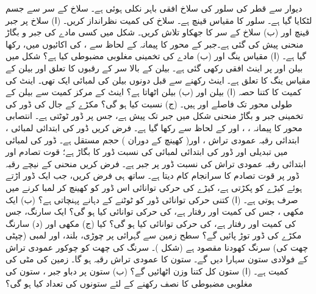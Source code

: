دیوار سے  قطر کی  سلور  کی سلاخ افقی  باہر نکلی ہوئی ہے۔ سلاخ کے سر
 سے  جسم لٹکایا گیا ہے۔ سلور  کا مقیاس قینچ   ہے۔ سلاخ کی کمیت نظرانداز کریں۔ (ا) سلاخ پر جبر  قینچ اور (ب)  سلاخ کے سر کا جھکاو تلاش کریں۔
شکل  میں کسی مادے کی  جبر و بگاڑ منحنی پیش  کی گئی ہے۔جبر کے محور کا پیمانہ  کے لحاظ سے ،  کی اکائیوں میں، رکھا گیا ہے۔ (ا) مقیاس ینگ اور (ب)  مادے کی تخمینی مغلوبی مضبوطی کیا ہے؟
شکل  میں بیلن  اور  پر اینٹ افقی  رکھی گئی ہے۔ بیلن کے بالا سر  کے رقبوں کا تعلق   اور   بیلن کے  مقیاس ینگ  کا تعلق  ہے۔  اینٹ رکھنے سے قبل دونوں بیلن کی لمبائی ایک تھی۔ اینٹ کی کمیت کا کتنا حصہ (ا) بیلن   اور (ب) بیلن  اٹھاتا ہے؟ اینٹ کے مرکز کمیت سے  بیلن  کے طولی محور تک فاصلے  اور  ہیں۔ (ج) نسبت  کیا ہو گی؟
مکڑے  کے  جال  کی  ڈور  کی  تخمینی جبر و بگاڑ منحنی شکل  میں    جبر  تک پیش ہے، جس پر ڈور ٹوٹتی ہے۔ انتصابی محور  کا پیمانہ
 ، ، اور 
  کے لحاظ سے رکھا گیا ہے۔ فرض کریں ڈور کی ابتدائی لمبائی ، ابتدائی رقبہ عمودی تراش ، اور(  کھینچ کے دوران ) حجم مستقل ہے۔ ڈور کی لمبائی میں تبدیلی  اور ڈور کی  ابتدائی لمبائی  کی نسبت ڈور  کا بگاڑ  ہے؛   قوت  تصادم   اور ابتدائی رقبہ عمودی تراش  کی نسبت ڈور پر جبر ہے۔ فرض کریں   منحنی کے نیچے رقبہ  ڈور پر قوت تصادم  کا سرانجام کام دیتا ہے۔ ساتھ ہی فرض کریں،  جب ایک ڈور    اڑتے ہوئے کیڑے کو پکڑتی ہے، کیڑے کی حرکی توانائی  اس ڈور کو کھینچ کر لمبا  کرنے میں صرف ہوتی ہے۔ (ا)  کتنی حرکی توانائی ڈور کو ٹوٹنے کے دہانے پہنچاتی ہے؟ (ب) ایک مکھی ، جس کی کمیت  اور رفتار  ہے، کی حرکی توانائی کیا ہو گی؟ ایک سارنگ، جس کی کمیت  اور رفتار  ہے، کی حرکی توانائی کیا ہو گی؟ کیا (ج) مکھی اور (د) سارنگ مکڑے کی ڈور توڑ پائیں گے؟
سطح زمین سے  گہرائی پر   چوڑی،  بلند،  اور  لمبی (چپٹی چھت کی) سرنگ  کھودنا مقصود ہے (شکل )۔ سرنگ کی چھت  کو  چوکور عمودی تراش  کے  فولادی ستون سہارا دیں گے۔ ستون کا عمودی تراش رقبہ  ہو گا۔ زمین کی   مٹی  کی کمیت  ہے۔ (ا)  ستون کل کتنا وزن اٹھائیں گے؟ (ب)  ستون پر   دباو جبر ، ستون کی  مغلوبی مضبوطی کا نصف رکھنے کے لئے  ستونوں کی تعداد کیا ہو گی؟
